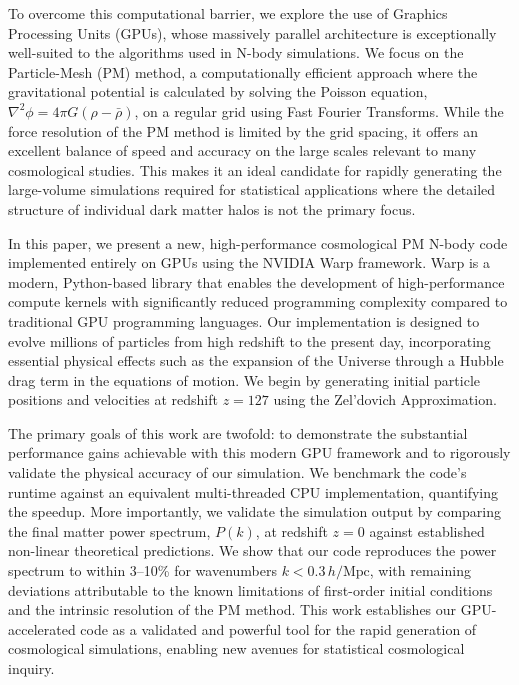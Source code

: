 \documentclass[]{article}
\begin{document}
To overcome this computational barrier, we explore the use of Graphics Processing Units (GPUs), whose massively parallel architecture is exceptionally well-suited to the algorithms used in N-body simulations. We focus on the Particle-Mesh (PM) method, a computationally efficient approach where the gravitational potential is calculated by solving the Poisson equation, $\nabla^2 \phi = 4 \pi G (\rho - \bar{\rho})$, on a regular grid using Fast Fourier Transforms. While the force resolution of the PM method is limited by the grid spacing, it offers an excellent balance of speed and accuracy on the large scales relevant to many cosmological studies. This makes it an ideal candidate for rapidly generating the large-volume simulations required for statistical applications where the detailed structure of individual dark matter halos is not the primary focus.

In this paper, we present a new, high-performance cosmological PM N-body code implemented entirely on GPUs using the NVIDIA Warp framework. Warp is a modern, Python-based library that enables the development of high-performance compute kernels with significantly reduced programming complexity compared to traditional GPU programming languages. Our implementation is designed to evolve millions of particles from high redshift to the present day, incorporating essential physical effects such as the expansion of the Universe through a Hubble drag term in the equations of motion. We begin by generating initial particle positions and velocities at redshift $z=127$ using the Zel'dovich Approximation.

The primary goals of this work are twofold: to demonstrate the substantial performance gains achievable with this modern GPU framework and to rigorously validate the physical accuracy of our simulation. We benchmark the code's runtime against an equivalent multi-threaded CPU implementation, quantifying the speedup. More importantly, we validate the simulation output by comparing the final matter power spectrum, $P(k)$, at redshift $z=0$ against established non-linear theoretical predictions. We show that our code reproduces the power spectrum to within 3--10\% for wavenumbers $k < 0.3 \, h/\text{Mpc}$, with remaining deviations attributable to the known limitations of first-order initial conditions and the intrinsic resolution of the PM method. This work establishes our GPU-accelerated code as a validated and powerful tool for the rapid generation of cosmological simulations, enabling new avenues for statistical cosmological inquiry.
\end{document}
